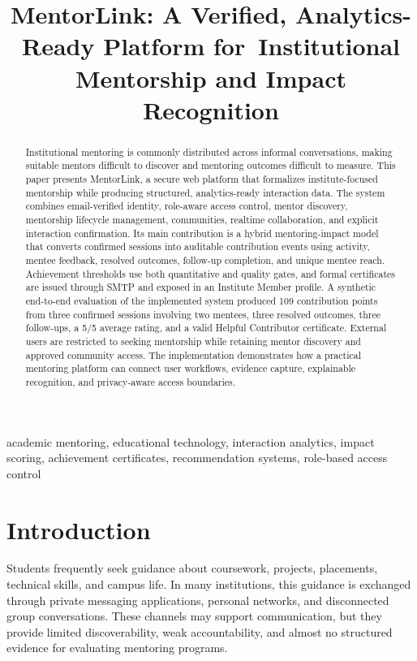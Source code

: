 \documentclass[conference]{IEEEtran}
\begin{document}
\title{MentorLink: A Verified, Analytics-Ready Platform for\ Institutional Mentorship and Impact Recognition}

\author{}

\maketitle

\begin{abstract}
Institutional mentoring is commonly distributed across informal conversations, making suitable mentors difficult to discover and mentoring outcomes difficult to measure. This paper presents MentorLink, a secure web platform that formalizes institute-focused mentorship while producing structured, analytics-ready interaction data. The system combines email-verified identity, role-aware access control, mentor discovery, mentorship lifecycle management, communities, realtime collaboration, and explicit interaction confirmation. Its main contribution is a hybrid mentoring-impact model that converts confirmed sessions into auditable contribution events using activity, mentee feedback, resolved outcomes, follow-up completion, and unique mentee reach. Achievement thresholds use both quantitative and quality gates, and formal certificates are issued through SMTP and exposed in an Institute Member profile. A synthetic end-to-end evaluation of the implemented system produced 109 contribution points from three confirmed sessions involving two mentees, three resolved outcomes, three follow-ups, a 5/5 average rating, and a valid Helpful Contributor certificate. External users are restricted to seeking mentorship while retaining mentor discovery and approved community access. The implementation demonstrates how a practical mentoring platform can connect user workflows, evidence capture, explainable recognition, and privacy-aware access boundaries.
\end{abstract}

\begin{IEEEkeywords}
academic mentoring, educational technology, interaction analytics, impact scoring, achievement certificates, recommendation systems, role-based access control
\end{IEEEkeywords}

\section{Introduction}
Students frequently seek guidance about coursework, projects, placements, technical skills, and campus life. In many institutions, this guidance is exchanged through private messaging applications, personal networks, and disconnected group conversations. These channels may support communication, but they provide limited discoverability, weak accountability, and almost no structured evidence for evaluating mentoring programs.
\end{document}
